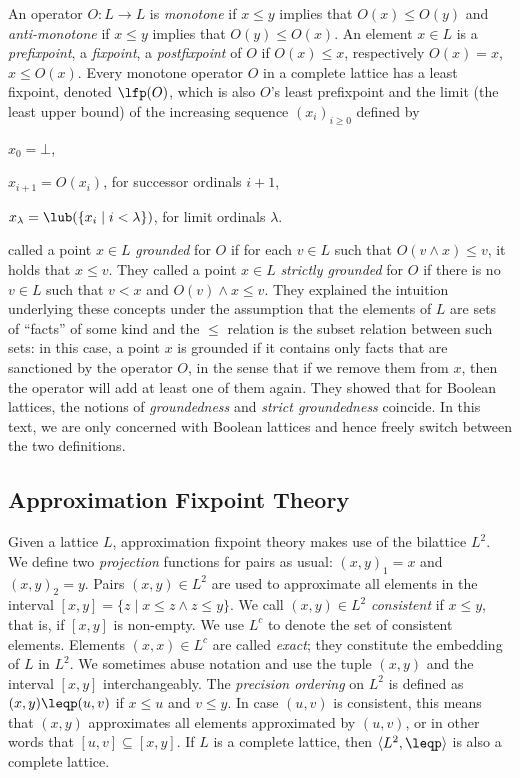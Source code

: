 An operator $O:L\to L$ is \emph{monotone} if $x\leq y$ implies that $O(x)\leq O(y)$ and \emph{anti-monotone} if $x\leq y$ implies that $O(y)\leq O(x)$. An element $x\in L$ is a \emph{prefixpoint}, a \emph{fixpoint}, a \emph{postfixpoint} of $O$ if $O(x)\leq x$, respectively $O(x)=x$, $x\leq O(x)$. 
Every monotone operator $O$ in a %
complete lattice has a least fixpoint, denoted $\lfp(O)$, which is also $O$'s least prefixpoint and the limit (the least upper bound) of the increasing sequence $(x_i)_{i\geq 0}$ defined by
\begin{compactitem}
	\item $x_0=\bot$,
	\item $x_{i+1}=O(x_i)$, for successor ordinals $i+1$,
	\item $x_\lambda=\lub(\{x_i\mid i<\lambda\})$, for limit ordinals $\lambda$.
\end{compactitem}


 called a point  $x\in L$ \emph{grounded} for $O$ if for each $v\in L$ such that $O(v\land
  x)\leq v$, it holds that $x\leq v$.   They called a point $x\in L$ \emph{strictly grounded} for $O$ if there is no $v\in L$ such that $v<x$ and $O(v)\land x \leq v$.
They explained the intuition underlying these concepts under the assumption that the elements of $L$ are sets of ``facts'' of some kind and the $\leq$ relation is the subset relation between such sets:
in this case, a point $x$ is grounded if it contains only facts that are sanctioned by the operator $O$, 
in the sense that if we remove them from $x$, then the operator will add at least one of them again. 
They showed that for Boolean lattices, the notions of \emph{groundedness} and \emph{strict groundedness} coincide. 
In this text, we are only concerned with Boolean lattices and hence freely switch between the two definitions. 



\subsection{Approximation Fixpoint Theory}


Given a lattice $L$, approximation fixpoint theory makes use of the bilattice 
$L^2$.  We define two \emph{projection} functions for pairs as usual:
$(x,y)_1=x$ and $(x,y)_2=y$.  Pairs $(x,y)\in L^2$ are used to
approximate all elements in the interval $[x,y] = \{z\mid x\leq
z\wedge z\leq y\}$. We call $(x,y)\in L^2$ \emph{consistent} if $x\leq
y$, that is, if $[x,y]$ is non-empty. We use $L^c$ to denote the set
of consistent elements. Elements $(x,x) \in L^c$ are called
\emph{exact}; they constitute the embedding of $L$ in $L^2$.  We sometimes abuse notation and use the tuple $(x,y)$
and the interval $[x,y]$ interchangeably.  The \emph{precision
  ordering} on $L^2$ is defined as $(x,y) \leqp (u,v)$ if $x\leq u$
and $v\leq y$. In case $(u,v)$ is consistent, this means that $(x,y)$
approximates all elements approximated by $(u,v)$, or in other words
that $[u,v]\subseteq [x,y]$.  If $L$ is a complete lattice, then
$\langle L^2,\leqp\rangle$ is also a complete lattice.
  
